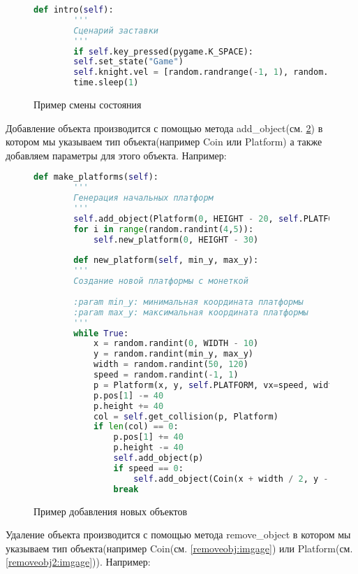 \begin{figure}[H]
	\begin{lstlisting}[language=Python]
		def intro(self):
		'''
		Сценарий заставки
		'''
		if self.key_pressed(pygame.K_SPACE):
		self.set_state("Game")
		self.knight.vel = [random.randrange(-1, 1), random.randrange(-1, 1)]
		time.sleep(1)
	\end{lstlisting}
	\caption{Пример смены состояния}
	\label{setstate:imgage}
\end{figure}

Добавление объекта производится с помощью метода add\_object(см. \ref{addobj:imgage}) в котором мы указываем тип объекта(например Coin или Platform) а также добавляем параметры для этого объекта. Например:

\begin{figure}[H]
	\begin{lstlisting}[language=Python]
	def make_platforms(self):
		'''
		Генерация начальных платформ
		'''
		self.add_object(Platform(0, HEIGHT - 20, self.PLATFORM, width=450, height=80))
		for i in range(random.randint(4,5)):
			self.new_platform(0, HEIGHT - 30)
		
		def new_platform(self, min_y, max_y):
		'''
		Создание новой платформы с монеткой
		
		:param min_y: минимальная координата платформы
		:param max_y: максимальная координата платформы
		'''
		while True:
			x = random.randint(0, WIDTH - 10)
			y = random.randint(min_y, max_y)
			width = random.randint(50, 120)
			speed = random.randint(-1, 1)
			p = Platform(x, y, self.PLATFORM, vx=speed, width=width)
			p.pos[1] -= 40
			p.height += 40
			col = self.get_collision(p, Platform)
			if len(col) == 0:
				p.pos[1] += 40
				p.height -= 40
				self.add_object(p)
				if speed == 0:
					self.add_object(Coin(x + width / 2, y - 50, self.COIN))
				break
	\end{lstlisting}
	\caption{Пример добавления новых объектов}
	\label{addobj:imgage}
\end{figure}

Удаление объекта  производится с помощью метода remove\_object в котором мы указываем тип объекта(например Coin(см. \ref{removeobj:imgage}) или Platform(см. \ref{removeobj2:imgage})). Например:

